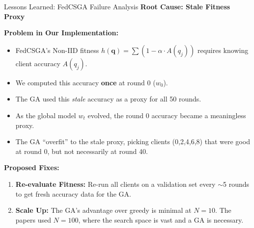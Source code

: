 \documentclass{beamer}
\begin{document}
\begin{frame}{Lessons Learned: FedCSGA Failure Analysis}
\textbf{Root Cause: Stale Fitness Proxy}

\textbf{Problem in Our Implementation:}
\begin{itemize}
    \item FedCSGA's Non-IID fitness $h(\mathbf{q}) = \sum (1 - \alpha \cdot A(q_{j}))$ requires knowing client accuracy $A(q_j)$.
    \item We computed this accuracy \textbf{once} at round 0 ($w_0$).
    \item The GA used this \textit{stale} accuracy as a proxy for all 50 rounds.
    \item As the global model $w_t$ evolved, the round 0 accuracy became a meaningless proxy.
    \item The GA ``overfit'' to the stale proxy, picking clients (0,2,4,6,8) that were good at round 0, but not necessarily at round 40.
\end{itemize}

\textbf{Proposed Fixes:}
\begin{enumerate}
    \item \textbf{Re-evaluate Fitness:} Re-run all clients on a validation set every $\sim$5 rounds to get fresh accuracy data for the GA.
    \item \textbf{Scale Up:} The GA's advantage over greedy is minimal at $N=10$. The papers used $N=100$, where the search space is vast and a GA is necessary. 
\end{enumerate}
\end{frame}
\end{document}
